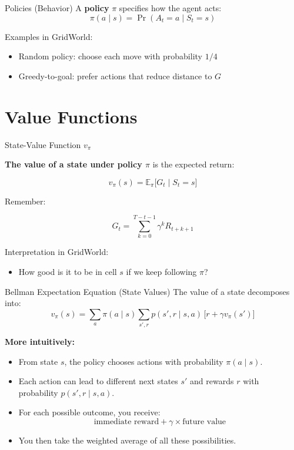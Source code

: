 \documentclass[11pt]{beamer}
\begin{document}
\begin{frame}{Policies (Behavior)}
A \textbf{policy} $\pi$ specifies how the agent acts:
\[
\pi(a\mid s) = \Pr(A_t=a \mid S_t=s)
\]

\vspace{6pt}
Examples in GridWorld:
\begin{itemize}
  \item Random policy: choose each move with probability $1/4$
  \item Greedy-to-goal: prefer actions that reduce distance to $G$
\end{itemize}

\end{frame}

\section{Value Functions}

\begin{frame}{State-Value Function $v_\pi$}
	
\textbf{The value of a state under policy $\pi$} is the expected return:

\[
 v_\pi(s) = \mathbb{E}_\pi\big[ G_t \mid S_t=s \big]
\]

Remember: 

\[
G_t = \sum_{k=0}^{T-t-1} \gamma^k R_{t+k+1}
\]

\vspace{6pt}
Interpretation in GridWorld:
\begin{itemize}
  \item How good is it to be in cell $s$ if we keep following $\pi$?
\end{itemize}
\end{frame}

\begin{frame}{Bellman Expectation Equation (State Values)}
	The value of a state decomposes into:
	\[
	v_\pi(s) = \sum_{a} \pi(a\mid s) \sum_{s',r} p(s',r\mid s,a)\,\big[r + \gamma v_\pi(s')\big]
	\]

\vspace{3pt}

\textbf{More intuitively:}

\begin{itemize}
	\item From state $s$, the policy chooses actions with probability $\pi(a \mid s)$.
	
	\item Each action can lead to different next states $s'$ and rewards $r$ with probability $p(s', r \mid s, a)$.
	
	\item For each possible outcome, you receive:
	\[
	\text{immediate reward} + \gamma \times \text{future value}
	\]
	
	\item You then take the weighted average of all these possibilities.
\end{itemize}

\end{frame}
\end{document}

